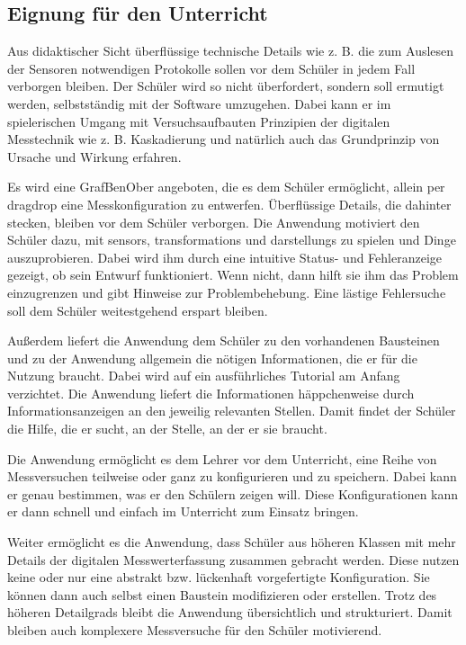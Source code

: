 \documentclass[parskip=full]{scrartcl}
\begin{document}
\subsection{Eignung für den Unterricht}

Aus didaktischer Sicht überflüssige technische Details wie z. B. die zum Auslesen der Sensoren notwendigen Protokolle sollen vor dem Schüler in jedem Fall verborgen bleiben.
Der Schüler wird so nicht überfordert, sondern soll ermutigt werden, selbstständig mit der Software umzugehen. 
Dabei kann er im spielerischen Umgang mit Versuchsaufbauten Prinzipien der digitalen Messtechnik wie z. B. Kaskadierung und natürlich auch das Grundprinzip von Ursache und Wirkung erfahren.

Es wird eine \gls{GrafBenOber} angeboten, die es dem Schüler ermöglicht, allein per \gls{dragdrop} eine Messkonfiguration zu entwerfen. 
Überflüssige Details, die dahinter stecken, bleiben vor dem Schüler verborgen.
Die Anwendung motiviert den Schüler dazu, mit \glspl{sensor}, \glspl{transformation} und \glspl{darstellung} zu spielen und Dinge auszuprobieren. 
Dabei wird ihm durch eine intuitive Status- und Fehleranzeige gezeigt, ob sein Entwurf funktioniert. 
Wenn nicht, dann hilft sie ihm das Problem einzugrenzen und gibt Hinweise zur Problembehebung. 
Eine lästige Fehlersuche soll dem Schüler weitestgehend erspart bleiben. 

Außerdem liefert die Anwendung dem Schüler zu den vorhandenen Bausteinen und zu der Anwendung allgemein die nötigen Informationen, die er für die Nutzung braucht. Dabei wird auf ein ausführliches Tutorial am Anfang verzichtet. Die Anwendung liefert die Informationen häppchenweise durch Informationsanzeigen an den jeweilig relevanten Stellen. Damit findet der Schüler die Hilfe, die er sucht, an der Stelle, an der er sie braucht.

Die Anwendung ermöglicht es dem Lehrer vor dem Unterricht, eine Reihe von Messversuchen teilweise oder ganz zu konfigurieren und zu speichern. Dabei kann er genau bestimmen, was er den Schülern zeigen will. Diese Konfigurationen kann er dann schnell und einfach im Unterricht zum Einsatz bringen. 

Weiter ermöglicht es die Anwendung, dass Schüler aus höheren Klassen mit mehr Details der digitalen Messwerterfassung zusammen gebracht werden. Diese nutzen keine oder nur eine abstrakt bzw. lückenhaft vorgefertigte Konfiguration. Sie können dann auch selbst einen Baustein modifizieren oder erstellen. Trotz des höheren Detailgrads bleibt die Anwendung übersichtlich und strukturiert. Damit bleiben auch komplexere Messversuche für den Schüler motivierend. 
\end{document}
